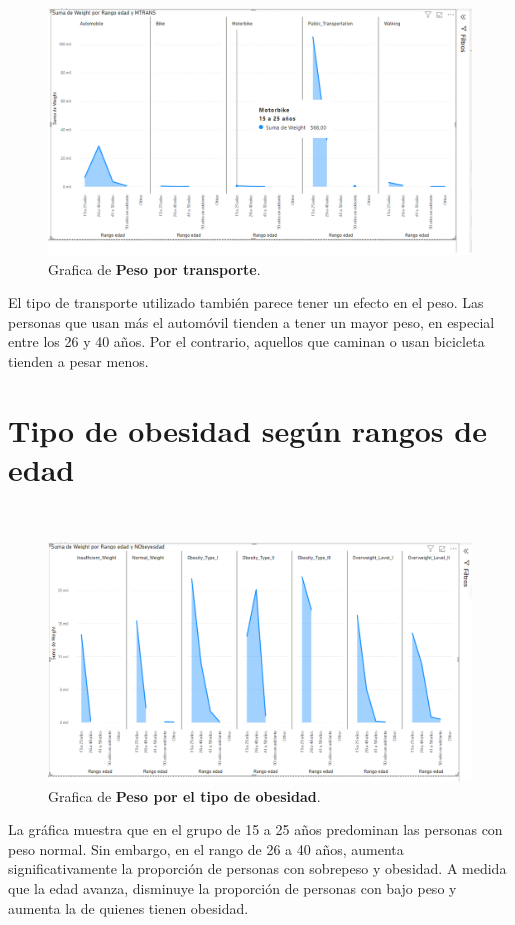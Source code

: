 \documentclass[a4paper]{report} %
\begin{document}
\paragraph{}\mbox{} \\
\begin{figure}[htb]
                \centering
                  \includegraphics[width=\textwidth]{Images/pesoportransporte.png}
                  \caption{Grafica de \textbf{Peso por transporte}.}
              \end{figure} 
El tipo de transporte utilizado también parece tener un efecto en el peso. Las personas que usan más el automóvil tienden a tener un mayor peso, en especial entre los 26 y 40 años. Por el contrario, aquellos que caminan o usan bicicleta tienden a pesar menos.
\section{Tipo de obesidad según rangos de edad}
\paragraph{}\mbox{} \\
\begin{figure}[htb]
                \centering
                  \includegraphics[width=\textwidth]{Images/pesotipoobesidad.png}
                  \caption{Grafica de \textbf{Peso por el tipo de obesidad}.}
              \end{figure} 
La gráfica muestra que en el grupo de 15 a 25 años predominan las personas con peso normal. Sin embargo, en el rango de 26 a 40 años, aumenta significativamente la proporción de personas con sobrepeso y obesidad. A medida que la edad avanza, disminuye la proporción de personas con bajo peso y aumenta la de quienes tienen obesidad.
            
\end{document}
